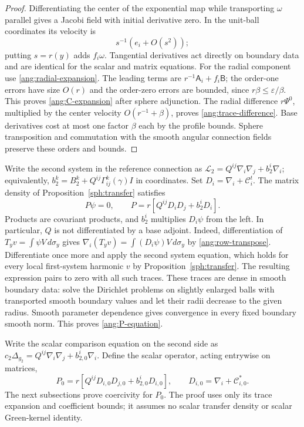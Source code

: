 \begin{proof}
Differentiating the center of the exponential map while transporting
$\omega$ parallel gives a Jacobi field with initial derivative zero.
In the unit-ball coordinates its velocity is
\[
 s^{-1}(e_i+O(s^2));
\]
putting $s=r(y)$ adds $f_i\omega$.  Tangential derivatives act directly
on boundary data and are identical for the scalar and matrix equations.
For the radial component use \eqref{ang:radial-expansion}.  The leading
terms are $r^{-1}\mathsf A_i+f_i\mathsf B$; the order-one errors have
size $O(r)$ and the order-zero errors are bounded, since
$r\beta\le\varepsilon/\beta$.  This proves \eqref{ang:C-expansion}
after sphere adjunction.  The radial difference $r\Psi^0$, multiplied
by the center velocity $O(r^{-1}+\beta)$, proves
\eqref{ang:trace-difference}.  Base derivatives cost at most one factor
$\beta$ each by the profile bounds.  Sphere transposition and
commutation with the smooth angular connection fields preserve these
orders and bounds.
\end{proof}

Write the second system in the reference connection as
$\mathcal L_2=Q^{ij}\nabla_i\nabla_j+b_2^i\nabla_i$; equivalently,
$b_2^k=B_2^k+Q^{ij}\Gamma_{ij}^k(\gamma)I$ in coordinates.
Set $D_i=\nabla_i+\mathcal C_i^t$.  The matrix density of
Proposition~\ref{sph:transfer} satisfies
\begin{equation}\label{ang:P-equation}
 P\psi=0,\qquad
 P=r\left[Q^{ij}D_iD_j+b_2^iD_i\right].
\end{equation}
Products are covariant products, and $b_2^i$ multiplies $D_i\psi$ from
the left.  In particular, $Q$ is not differentiated by a base adjoint.
Indeed, differentiation of $T_yv=\int\psi V\,d\sigma_y$ gives
$\nabla_i(T_yv)=\int(D_i\psi)V\,d\sigma_y$ by
\eqref{ang:row-transpose}.  Differentiate once more and apply the second
system equation, which holds for every local first-system harmonic
$v$ by Proposition~\ref{sph:transfer}.  The resulting expression pairs
to zero with all such traces.  These traces are dense in smooth boundary
data: solve the Dirichlet problems on slightly enlarged balls with
transported smooth boundary values and let their radii decrease to the
given radius.  Smooth parameter dependence gives convergence in every
fixed boundary smooth norm.  This proves \eqref{ang:P-equation}.

Write the scalar comparison equation on the second side as
$c_2\Delta_{g_2}=Q^{ij}\nabla_i\nabla_j+b_{2,0}^i\nabla_i$.
Define the scalar operator,
acting entrywise on matrices,
\begin{equation}\label{ang:P0}
 P_0=r\left[Q^{ij}D_{i,0}D_{j,0}+b_{2,0}^iD_{i,0}\right],
 \qquad D_{i,0}=\nabla_i+\mathcal C_{i,0}^*.
\end{equation}
The next subsections prove coercivity for $P_0$.  The proof uses
only its trace expansion and coefficient bounds; it assumes no scalar
transfer density or scalar Green-kernel identity.

